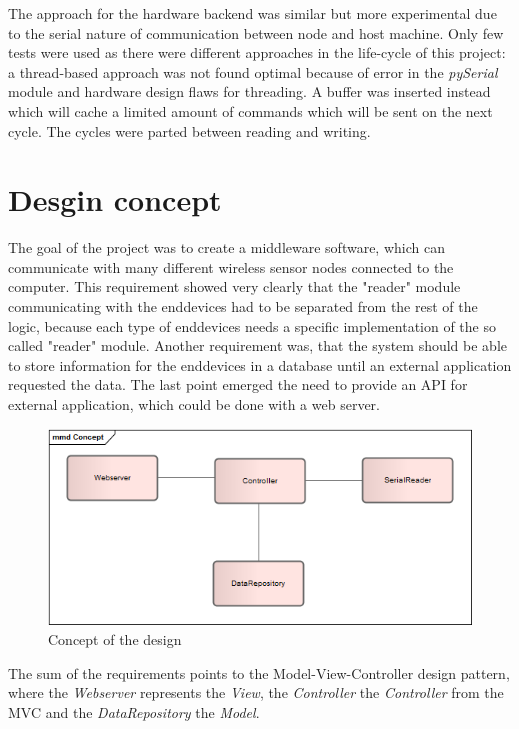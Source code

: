 The approach for the hardware backend was similar but more experimental due to the serial nature of communication between node and host machine. Only
few tests were used as there were different approaches in the life-cycle of this project: a thread-based approach was not found optimal because 
of error in the \textit{pySerial} module and hardware design flaws for threading. A buffer was inserted instead which will cache a limited amount of commands which
will be sent on the next cycle. The cycles were parted between reading and writing.

\section{Desgin concept}
The goal of the project was to create a middleware software, which can communicate with many different wireless sensor nodes connected to the computer. This requirement showed very clearly that the "reader" module communicating with the enddevices had to be separated from the rest of the logic, because each type of enddevices needs a specific implementation of the so called "reader" module. Another requirement was, that the system should be able to store information for the enddevices in a database until an external application requested the data. The last point emerged the need to provide an API for external application, which could be done with a web server.


\begin{figure}[H]
	\centering
	\includegraphics[width=1.0\textwidth]{pic/Concept.png}%
    \caption{Concept of the design}
    \label{Conceptpic}%
\end{figure}

The sum of the requirements points to the Model-View-Controller design pattern, where the \textit{Webserver} represents the \textit{View}, the \textit{Controller} the \textit{Controller} from the MVC and the \textit{DataRepository} the \textit{Model}.


